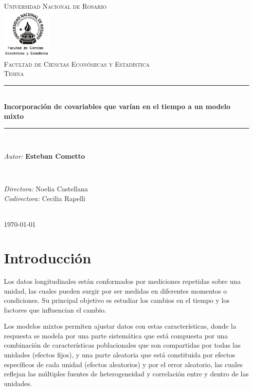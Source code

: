\documentclass[spanish]{article}
\title{\thesistitle}
\author{\thesisauthorfirst\space\thesisauthorsecond}
\date{\thesisdate}
\numberwithin{figure}{subsection}
\numberwithin{equation}{subsection}
\numberwithin{table}{subsection}
\def\thesistitle{Incorporación de covariables que varían en el tiempo a un modelo mixto}
\def\thesisauthorfirst{\textbf{Esteban Cometto}}
\def\thesissupervisorfirst{Noelia Castellana}
\def\thesissupervisorsecond{Cecilia Rapelli}
\def\thesisdate{\today}
\begin{document}
\begin{titlepage}
    \newcommand{\HRule}{\rule{\linewidth}{0.5mm}}
	\center
	\textsc{\Large Universidad Nacional de Rosario}\\[.7cm]
	\includegraphics[width=25mm]{img/fceye-unr.png}\\[.5cm]
	\textsc{Facultad de Ciencias Económicas y Estadística}\\[0.5cm]
	\textsc{Tesina}
	
	\HRule \\[0.4cm]
	{ \huge \bfseries \thesistitle}\\[0.1cm]
	\HRule \\[.5cm]
	
	\begin{minipage}{0.6\textwidth}
	\large
	\textit{Autor:}	\thesisauthorfirst
	\end{minipage}
	\\[.6cm]
	\begin{minipage}{0.6\textwidth}
	\textit{Directora:} 	\thesissupervisorfirst \\[.2cm]
	\textit{Codirectora:} 	\thesissupervisorsecond
	\end{minipage}
	\\[4cm]
	\vfill
	{\large \thesisdate}\\
	\clearpage
\end{titlepage}

\newpage
\tableofcontents

\newpage
\section{Introducción}

Los datos longitudinales están conformados por mediciones repetidas sobre una
unidad, las cuales pueden surgir por ser medidas en diferentes momentos o
condiciones. Su principal objetivo es estudiar los cambios en el tiempo y los
factores que influencian el cambio. 

Los modelos mixtos permiten ajustar datos con estas características, donde la
respuesta se modela por una parte sistemática que está compuesta por una
combinación de características poblacionales que son compartidas por todas las
unidades (efectos fijos), y una parte aleatoria que está constituida por efectos
específicos de cada unidad (efectos aleatorios) y por el error aleatorio, las
cuales reflejan las múltiples fuentes de heterogeneidad y correlación entre y
dentro de las unidades.
\end{document}
